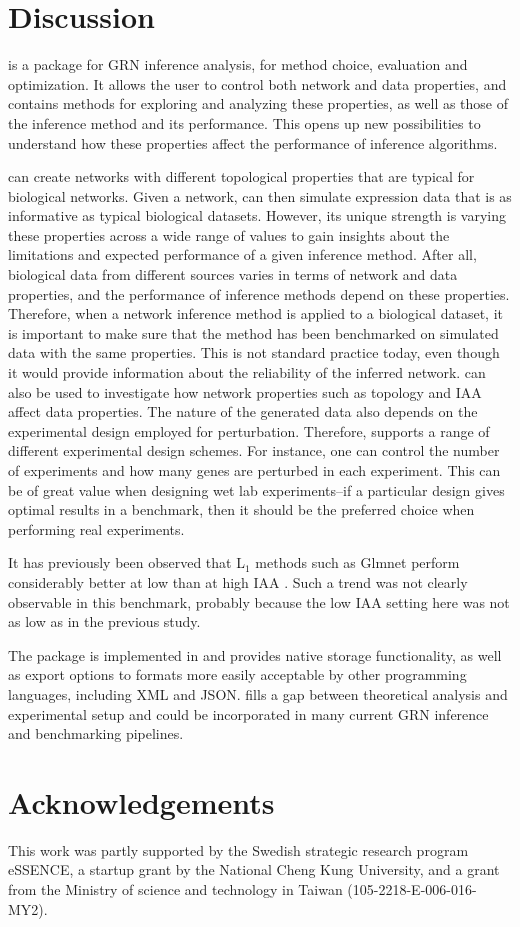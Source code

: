 \section{Discussion}
\label{discussion}
\gs is a package for GRN inference analysis, for method choice, evaluation and optimization.
It allows the user to control both network and data properties, and contains methods for exploring and analyzing these properties, as well as those of the inference method and its performance.
This opens up new possibilities to understand how these properties affect the performance of inference algorithms.

\gs can create networks with different topological properties that are typical for biological networks.
Given a network, \gs can then simulate expression data that is as informative as typical biological datasets.
However, its unique strength is varying these properties across a wide range of values to gain insights about the limitations and expected performance of a given inference method.
After all, biological data from different sources varies in terms of network and data properties, and the performance of inference methods depend on these properties.
Therefore, when a network inference method is applied to a biological dataset, it is important to make sure that the method has been benchmarked on simulated data with the same properties.
This is not standard practice today, even though it would provide information about the reliability of the inferred network.
%
\gs can also be used to investigate how network properties such as topology and IAA affect data properties.
The nature of the generated data also depends on the experimental design employed for perturbation.
Therefore, \gs supports a range of different experimental design schemes.
For instance, one can control the number of experiments and how many genes are perturbed in each experiment.
This can be of great value when designing wet lab experiments--if a particular design gives optimal results in a benchmark, then it should be the preferred choice when performing real experiments.

It has previously been observed that L$_1$ methods such as Glmnet perform considerably better at low than at high IAA   \citep{Tjarnberg2014}. Such a trend was not clearly observable in this benchmark, probably because the low IAA setting here was not as low as in the previous study.

The \gs package is implemented in \matlab and provides native storage functionality, as well as export options to formats more easily acceptable by other programming languages, including XML and JSON.
\gs fills a gap between theoretical analysis and experimental setup and could be incorporated in many current GRN inference and benchmarking pipelines.

\section{Acknowledgements}
\label{acknowledgements}
This work was partly supported by the Swedish strategic research program eSSENCE, a startup grant by the National Cheng Kung University, and a grant  from the Ministry of science and technology in Taiwan (105-2218-E-006-016-MY2).